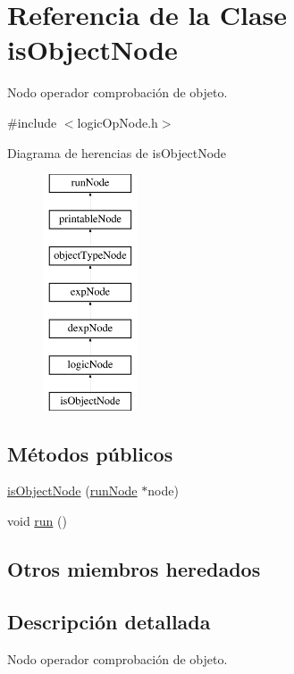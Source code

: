 \hypertarget{classisObjectNode}{\section{Referencia de la Clase is\-Object\-Node}
\label{classisObjectNode}
}


Nodo operador comprobación de objeto.  




{\ttfamily \#include $<$logic\-Op\-Node.\-h$>$}

Diagrama de herencias de is\-Object\-Node\begin{figure}[H]
\begin{center}
\leavevmode
\includegraphics[height=7.000000cm]{classisObjectNode}
\end{center}
\end{figure}
\subsection*{Métodos públicos}
\begin{DoxyCompactItemize}
\item 
\hyperlink{classisObjectNode_a4d6aed43426db8a992d0bb8515285fe8}{is\-Object\-Node} (\hyperlink{classrunNode}{run\-Node} $\ast$node)
\item 
void \hyperlink{classisObjectNode_aa88000acc716f0b07adf772d33003385}{run} ()
\end{DoxyCompactItemize}
\subsection*{Otros miembros heredados}


\subsection{Descripción detallada}
Nodo operador comprobación de objeto. 

